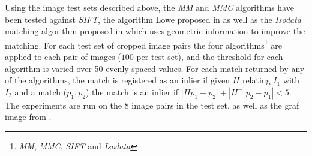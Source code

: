 \documentclass[12pt,journal,compsoc]{IEEEtran}
\begin{document}
%
%
Using the image test sets described above, the \emph{MM} and \emph{MMC} 
algorithms have been tested against \emph{SIFT}, the algorithm Lowe 
proposed in \cite{lowe2004sift} as well as the \emph{Isodata} matching 
algorithm proposed in \cite{das2008event} which uses geometric 
information to improve the matching. For each test set of cropped image 
pairs the four algorithms\footnote{\emph{MM}, \emph{MMC}, \emph{SIFT} 
and \emph{Isodata}} are applied to each pair of images ($100$ per test 
set), and the threshold for each algorithm is varied over 50 evenly 
spaced values. For each match returned by any of the algorithms, the 
match is registered as an inlier if given $H$ relating $I_1$ with $I_2$ 
and a match ($p_1, p_2$) the match is an inlier if $\left\vert Hp_1 - 
p_2 \right\vert + \left\vert H^{-1}p_2 - p_1 \right\vert < 5$. The 
experiments are run on the $8$ image pairs in the test set, as well as 
the graf image from \cite{mikolajczyk2005performance}.
%
\end{document}
